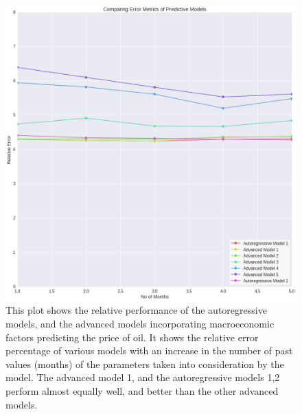 \documentclass[runningheads]{llncs}
\begin{document}
\begin{figure}
\centering
\includegraphics[width=\textwidth]{ModelComparison_Gold.png}
\caption{This plot shows the relative performance of the autoregressive models, and the advanced models incorporating macroeconomic factors predicting the price of oil. It shows the relative error percentage of various models with an increase in the number of past values (months) of the parameters taken into consideration by the model. The advanced model 1, and the autoregressive models 1,2 perform almost equally well, and better than the other advanced models. }
\label{fig:ModelComparison_Oil.png}
\label{fig:ModelComparison_Gold.png}
\end{figure}
\end{document}
